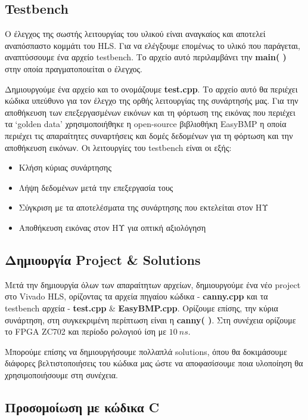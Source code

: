 \subsection{Testbench}

Ο έλεγχος της σωστής λειτουργίας του υλικού είναι αναγκαίος και αποτελεί αναπόσπαστο κομμάτι του HLS. Για να ελέγξουμε επομένως το υλικό που παράγεται, αναπτύσσουμε ένα αρχείο testbench. Το αρχείο αυτό περιλαμβάνει την \textbf{main( )} στην οποία πραγματοποιείται ο έλεγχος.

Δημιουργούμε ένα αρχείο και το ονομάζουμε \textbf{test.cpp}. Το αρχείο αυτό θα περιέχει κώδικα υπεύθυνο για τον έλεγχο της ορθής λειτουργίας της συνάρτησής μας. Για την αποθήκευση των επεξεργασμένων εικόνων και τη φόρτωση της εικόνας που περιέχει τα `golden data' χρησιμοποιήθηκε η open-source βιβλιοθήκη EasyBMP \cite{EasyBMPC47:online} η οποία περιέχει τις απαραίτητες συναρτήσεις και δομές δεδομένων για τη φόρτωση και την αποθήκευση εικόνων. Οι λειτουργίες του testbench είναι οι εξής:
\begin{itemize}[leftmargin=*]
	\item{Κλήση κύριας συνάρτησης}
	\item{Λήψη δεδομένων μετά την επεξεργασία τους}
	\item{Σύγκριση με τα αποτελέσματα της συνάρτησης που εκτελείται στον ΗΥ}
	\item{Αποθήκευση εικόνας στον ΗΥ για οπτική αξιολόγηση}\\
\end{itemize}
\subsection{Δημιουργία Project \& Solutions}

Μετά την δημιουργία όλων των απαραίτητων αρχείων, δημιουργούμε ένα νέο project στο Vivado HLS, ορίζοντας τα αρχεία πηγαίου κώδικα - \textbf{canny.cpp} και τα testbench αρχεία - \textbf{test.cpp} \& \textbf{EasyBMP.cpp}. Ορίζουμε επίσης, την κύρια συνάρτηση, στη συγκεκριμένη περίπτωση είναι η \textbf{canny( )}. Στη συνέχεια ορίζουμε το FPGA ZC702 και περίοδο ρολογιού ίση με $10\ ns$.

Μπορούμε επίσης να δημιουργήσουμε πολλαπλά solutions, όπου θα δοκιμάσουμε διάφορες βελτιστοποιήσεις του κώδικα μας ώστε να αποφασίσουμε ποια υλοποίηση θα χρησιμοποιήσουμε στη συνέχεια.
\subsection{Προσομοίωση με κώδικα C}

